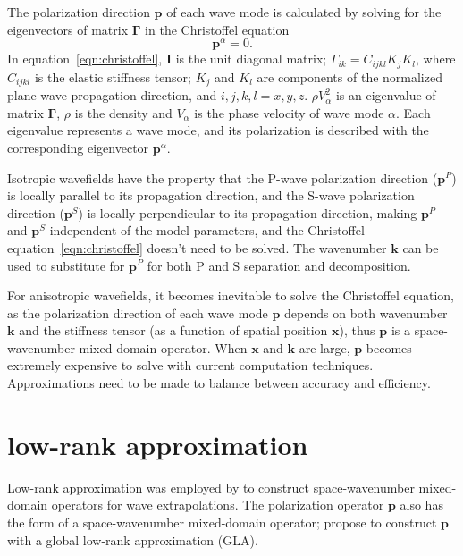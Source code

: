 \documentclass[manuscript,ulem,graphix,revised]{geophysics}
\begin{document}
The polarization direction $\boldsymbol{p}$ of each wave mode is calculated by solving for the eigenvectors of matrix $\boldsymbol{\Gamma}$ in the Christoffel equation \citep{aki80, tsvankin05}
\begin{equation}
[\boldsymbol{\Gamma}-\rho V_\alpha^2\boldsymbol{I}]\boldsymbol{p}^\alpha=0. 
\label{eqn:christoffel}
\end{equation}
In equation~\ref{eqn:christoffel}, $\boldsymbol{I}$ is the unit diagonal matrix; $\Gamma_{ik}=C_{ijkl}K_jK_l$, where $C_{ijkl}$ is the elastic stiffness tensor; $K_j$ and $K_l$ are components of the normalized plane-wave-propagation direction, and $i,j,k,l = x,y,z$. $\rho V_\alpha^2$ is an eigenvalue of matrix $\boldsymbol{\Gamma}$, $\rho$ is the density and $V_\alpha$ is the phase velocity of wave mode $\alpha$. Each eigenvalue represents a wave mode, and its polarization is described with the corresponding eigenvector $\boldsymbol{p}^\alpha$.

Isotropic wavefields have the property that the P-wave polarization direction ($\boldsymbol{p}^P$) is locally parallel to its propagation direction, and the S-wave polarization direction ($\boldsymbol{p}^S$) is locally perpendicular to its propagation direction, making $\boldsymbol{p}^P$ and $\boldsymbol{p}^S$ independent of the model parameters, and the Christoffel equation~\ref{eqn:christoffel} doesn't need to be solved. The wavenumber $\boldsymbol{k}$ can be used to substitute for $\boldsymbol{p}^P$ for both P and S separation and decomposition.

For anisotropic wavefields, it becomes inevitable to solve the Christoffel equation, as the polarization direction of each wave mode $\boldsymbol{p}$ depends on both wavenumber $\boldsymbol{k}$ and the stiffness tensor (as a function of spatial position $\boldsymbol{x}$),
thus $\boldsymbol{p}$ is a space-wavenumber mixed-domain operator. When $\boldsymbol{x}$ and $\boldsymbol{k}$ are large, $\boldsymbol{p}$ becomes extremely expensive to solve with current computation techniques. Approximations need to be made to balance between accuracy and efficiency.


\section{low-rank approximation}
\indent\indent
Low-rank approximation was  employed by \citet{fomel13} to construct space-wavenumber mixed-domain operators for wave extrapolations. The polarization operator $\boldsymbol{p}$ also has the form of a space-wavenumber mixed-domain operator; \citet{cheng14} propose to construct $\boldsymbol{p}$ with a global low-rank approximation (GLA).
\end{document}
